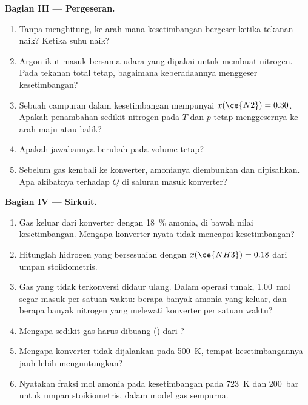 \begin{problem}
\medskip
\noindent\textbf{Bagian III --- Pergeseran.}
\begin{enumerate}[resume]
  \item Tanpa menghitung, ke arah mana kesetimbangan bergeser ketika
        tekanan naik? Ketika suhu naik?
  \item Argon ikut masuk bersama udara yang dipakai untuk membuat nitrogen.
        Pada tekanan total tetap, bagaimana keberadaannya menggeser
        kesetimbangan?
  \item Sebuah campuran dalam kesetimbangan mempunyai $x(\ce{N2}) = 0.30$.
        Apakah penambahan sedikit nitrogen pada $T$ dan $p$ tetap
        menggesernya ke arah maju atau balik?
  \item Apakah jawabannya berubah pada volume tetap?
  \item Sebelum gas kembali ke konverter, amonianya diembunkan dan
        dipisahkan. Apa akibatnya terhadap $Q$ di saluran masuk konverter?
\end{enumerate}

\medskip
\noindent\textbf{Bagian IV --- Sirkuit.}
\begin{enumerate}[resume]
  \item Gas keluar dari konverter dengan \qty{18}{\percent} amonia, di
        bawah nilai kesetimbangan. Mengapa konverter nyata tidak mencapai
        kesetimbangan?
  \item Hitunglah  hidrogen yang bersesuaian dengan
        $x(\ce{NH3}) = 0.18$ dari umpan stoikiometris.
  \item Gas yang tidak terkonversi didaur ulang. Dalam operasi tunak,
        \qty{1.00}{mol}  segar masuk per satuan waktu: berapa banyak
        amonia yang keluar, dan berapa banyak nitrogen yang melewati
        konverter per satuan waktu?
  \item Mengapa sedikit gas harus dibuang () dari ?
  \item Mengapa konverter tidak dijalankan pada \qty{500}{K}, tempat
        kesetimbangannya jauh lebih menguntungkan?
  \item Nyatakan fraksi mol amonia pada kesetimbangan pada \qty{723}{K}
        dan \qty{200}{bar} untuk umpan stoikiometris, dalam model gas
        sempurna.
\end{enumerate}
\end{problem}
